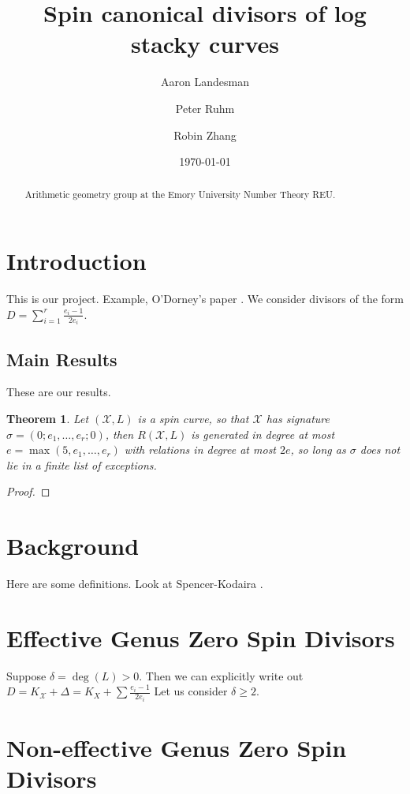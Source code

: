 \documentclass{amsart}
\title{Spin canonical divisors of log stacky curves}
\author{Aaron Landesman}
\author{Peter Ruhm}
\author{Robin Zhang}
\date{\today}
\theoremstyle{plain}
\newtheorem{thm}{Theorem}[section]
\theoremstyle{definition}
\theoremstyle{remark}
\numberwithin{equation}{section}
\newcommand \sx{\mathscr X}
\newcommand \halfcan{L}
\newcommand \subhalf[1]{\frac{e_{#1} - 1}{2e_{#1}}}
\begin{document}
\begin{abstract}
  Arithmetic geometry group at the Emory University Number Theory
	REU.
\end{abstract}

\maketitle

\section{Introduction}
This is our project.
Example, O'Dorney's paper \cite{dorney:canonical}.
We consider divisors of the form $D = \sum_{i = 1}^{r} \subhalf{i}$.

\subsection{Main Results}
These are our results.
\begin{thm}
\label{thm:g_0_generators_relations}
Let $(\sx,\halfcan)$ is a spin curve, so that $\sx$ has signature $\sigma = (0;e_1,\ldots, e_r;0)$, then $R(\sx,\halfcan)$ is generated in degree at most $e = \max(5,e_1,\ldots, e_r)$ with relations in degree at most $2e$, so long as $\sigma$ does not lie in a finite list of exceptions. 
\end{thm}
\begin{proof}

\end{proof}


\section{Background}
Here are some definitions.
Look at Spencer-Kodaira \cite{kodaira:complex-manifolds}.

\section{Effective Genus Zero Spin Divisors}
\label{sec:g_0_effective}
Suppose $\delta=\deg(\halfcan)>0$.  Then we can explicitly write out $D=K_\sx+\Delta=K_X+\sum \subhalf{i}$   Let us consider $\delta \geq 2$.

\section{Non-effective Genus Zero Spin Divisors}
\label{sec:g_0_non_effective}
\end{document}
